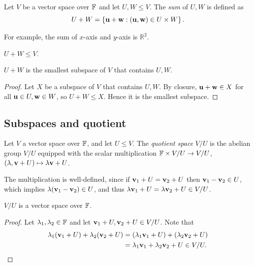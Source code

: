 \documentclass[a4paper]{article}
\begin{document}
\begin{definition}
    Let $V$ be a vector space over ${\mathbb{F}}$ and let $U,W\le V$. The \textit{sum} of $U,W$ is defined as 
    \[
        U+W  =\left\{ {\bf u}+{\bf w}: ({\bf u},{\bf w})\in U\times W \right\}.
    \] 
\end{definition}
For example, the sum of $x$-axis and $y$-axis is $ \mathbb{R}^{2} $.

\begin{proposition}
    $U+W\le V$.
\end{proposition}
\begin{proposition}
    $U+W$ is the smallest subspace of $V$ that contains $U,W$.
\end{proposition}
\begin{proof}
    Let $X$ be a subspace of $V$ that contains $U,W$. By closure, $ {\bf u}+{\bf w}\in X $ for all $ {\bf u}\in U,{\bf w}\in W $, so $ U+W\le X $. Hence it is the smallest subspace.
\end{proof}
\subsection{Subspaces and quotient}
\begin{definition}[Quotient]
    Let $V$ a vector space over ${\mathbb{F}}$, and let $U \leq V$. The \emph{quotient space} $V/U$ is the abelian group $V/U$ equipped with the scalar multiplication ${\mathbb{F}} \times V/U \rightarrow V/U$, $(\lambda, {\bf v} + U) \mapsto \lambda {\bf v} + U$.
\end{definition}
The multiplication is well-defined, since if $ {\bf v}_1+U={\bf v}_2+U $ then $ {\bf v}_1-{\bf v}_2\in U $, which implies $ \lambda({\bf v}_1-{\bf v}_2) \in U$, and thus $ \lambda{\bf v}_1+U=\lambda{\bf v}_2+U\in V/U $.
\begin{proposition}
    $V/U$ is a vector space over ${\mathbb{F}}$.
\end{proposition}
\begin{proof}
    Let $ \lambda_1,\lambda_2\in {\mathbb{F}} $ and let $ {\bf v}_1+U,{\bf v}_2+U\in V/U $. Note that 
    \begin{align*}
        \lambda_1({\bf v}_1+U)+\lambda_2({\bf v}_2+U) &= (\lambda_1{\bf v}_1+U)+(\lambda_2{\bf v}_2+U)\\ 
        &= \lambda_1{\bf v}_1+\lambda_2{\bf v}_2+U\in V/U.\qedhere
    \end{align*}
\end{proof}
\clearpage
\end{document}
